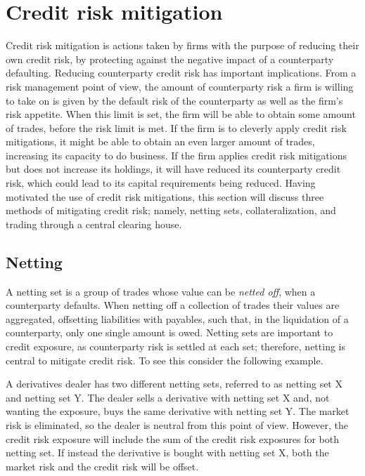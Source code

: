 \documentclass[main.tex]{subfiles}
\begin{document}
    \section{Credit risk mitigation}
    
    Credit risk mitigation is actions taken by firms 
    with the purpose of reducing their own credit risk,
    by protecting against the negative impact of a counterparty defaulting.
    Reducing counterparty credit risk has important implications.
    From a risk management point of view,
    the amount of counterparty risk a firm is willing to take on 
    is given by the default risk of the counterparty as well as the firm's risk appetite.
    When this limit is set, the firm will be able to obtain some amount of trades,
    before the risk limit is met.
    If the firm is to cleverly apply credit risk mitigations,
    it might be able to obtain an even larger amount of trades,
    increasing its capacity to do business.
    If the firm applies credit risk mitigations but does not increase its holdings, 
    it will have reduced its counterparty credit risk,
    which could lead to its capital requirements being reduced.
    Having motivated the use of credit risk mitigations,
    this section will discuss three methods of mitigating credit risk;
    namely, netting sets, collateralization, and trading through a central clearing house.

    \subsection{Netting}
        A netting set is a group of trades whose value can be \textit{netted off}, 
        when a counterparty defaults.
        When netting off a collection of trades their values are aggregated,
        offsetting liabilities with payables, such that, in the liquidation of a counterparty,
        only one single amount is owed.
        Netting sets are important to credit exposure, 
        as counterparty risk is settled at each set;
        therefore, netting is central to mitigate credit risk.
        To see this consider the following example.

        \begin{example}    
        A derivatives dealer has two different netting sets, 
        referred to as netting set X and netting set Y.
        The dealer sells a derivative with netting set X and, 
        not wanting the exposure, buys the same derivative with netting set Y.
        The market risk is eliminated, so the dealer is neutral from this point of view.
        However, the credit risk exposure will include the sum of the credit risk exposures
        for both netting set.
        If instead the derivative is bought with netting set X,
        both the market risk and the credit risk will be offset.
        \end{example}
\end{document}
